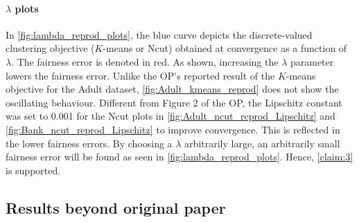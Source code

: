 \paragraph{$\lambda$ plots}
In \autoref{fig:lambda_reprod_plots}, the blue curve depicts the discrete-valued clustering objective ($K$-means or Ncut) obtained at convergence as a function of $\lambda$. The fairness error is denoted in red. As shown, increasing the $\lambda$ parameter lowers the fairness error. Unlike the OP's reported result of the $K$-means objective for the Adult dataset, \autoref{fig:Adult_kmeans_reprod} does not show the oscillating behaviour. Different from Figure 2 of the OP, the Lipschitz constant was set to 0.001 for the Ncut plots in \autoref{fig:Adult_ncut_reprod_Lipschitz} and \autoref{fig:Bank_ncut_reprod_Lipschitz} to improve convergence. This is reflected in the lower fairness errors. By choosing a $\lambda$ arbitrarily large, an arbitrarily small fairness error will be found as seen in \ref{fig:lambda_reprod_plots}. Hence, \ref{claim:3} is supported.


\subsection{Results beyond original paper}

